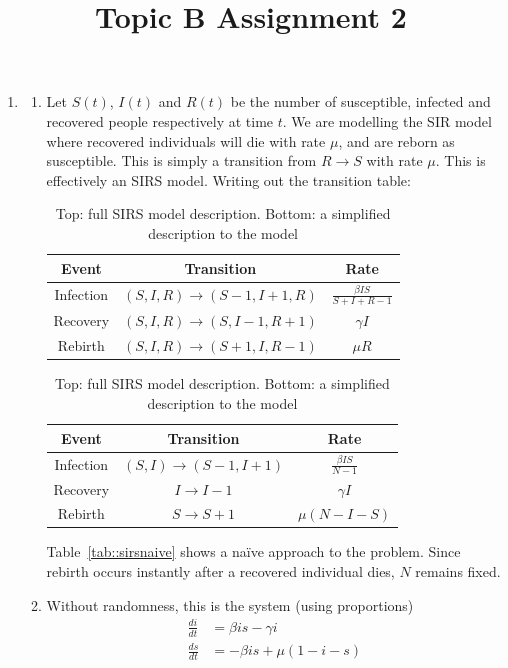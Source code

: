 \documentclass{/home/janmebows/Documents/LatexTemplates/myassignment}
\title{Topic B Assignment 2}
\begin{document}
\maketitle


\begin{enumerate}
	\item 
	\begin{enumerate}[label=(\roman*)]
		\item Let $S(t)$, $I(t)$ and $R(t)$ be the number of susceptible, infected and recovered people respectively at time $t$. We are modelling the SIR model where recovered individuals will die with rate $\mu$, and are reborn as susceptible. This is simply a transition from $R\to S$ with rate $\mu$. This is effectively an SIRS model. Writing out the transition table:
		\begin{table}[h]
		\centering
		\label{tab::sirsnaive}
		 	\begin{tabular}{c|c|c}
		 		Event&Transition&Rate\\
		 		\hline 
		 		Infection & $(S,I,R)\to (S-1,I+1,R)$ & $\frac{\beta IS}{S+I+R-1}$\\
		 		Recovery & $(S,I,R) \to (S,I-1,R+1)$ & $\gamma I$\\ 
		 		Rebirth & $(S,I,R)\to (S+1,I,R-1)$& $\mu R$
		 	\end{tabular}
		\label{tab::sirs}
		 	\begin{tabular}{c|c|c}
		 		Event&Transition&Rate\\
		 		\hline 
		 		Infection & $(S,I)\to (S-1,I+1)$ & $\frac{\beta IS}{N-1}$\\
		 		Recovery & $I \to I-1$ & $\gamma I$\\ 
		 		Rebirth & $S\to S+1$& $\mu (N-I-S)$
		 	\end{tabular}
		 	\caption{Top: full SIRS model description. Bottom: a simplified description to the model}
		 \end{table} 
		 Table~\ref{tab::sirsnaive} shows a na\"ive approach to the problem. Since rebirth occurs instantly after a recovered individual dies, $N$ remains fixed. 
		\begin{table}[h]
		\centering
		 \end{table} 
		\item %
		Without randomness, this is the system (using proportions)
		\begin{align*}
			\frac{di}{dt} &= \beta is - \gamma i\\
			\frac{ds}{dt} &= -\beta is + \mu(1-i-s)
		\end{align*}

\end{enumerate}
\end{enumerate}
\end{document}

